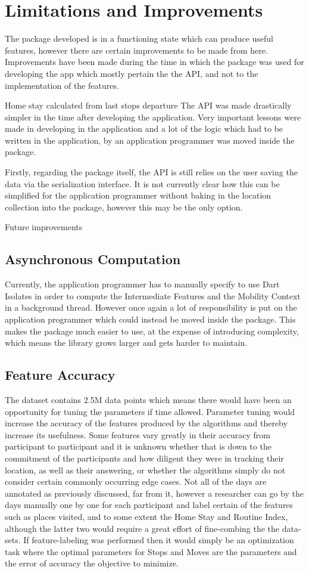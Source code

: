 \section{Limitations and Improvements}
The package developed is in a functioning state which can produce useful features, however there are certain improvements to be made from here. Improvements have been made during the time in which the package was used for developing the app which mostly pertain the the API, and not to the implementation of the features. 

Home stay calculated from last stops departure
The API was made drastically simpler in the time after developing the application. Very important lessons were made in developing in the application and a lot of the logic which had to be written in the application, by an application programmer was moved inside the package.

Firstly, regarding the package itself, the API is still relies on the user saving the data via the serialization interface. It is not currently clear how this can be simplified for the application programmer without baking in the location collection into the package, however this may be the only option. 

Future improvements

\subsection{Asynchronous Computation}
Currently, the application programmer has to manually specify to use Dart Isolates in order to compute the Intermediate Features and the Mobility Context in a background thread. However once again a lot of responsibility is put on the application programmer which could instead be moved inside the package. This makes the package much easier to use, at the expense of introducing complexity, which means the library grows larger and gets harder to maintain.

\subsection{Feature Accuracy}
The dataset contains 2.5M data points which means there would have been an opportunity for tuning the parameters if time allowed. Parameter tuning would increase the accuracy of the features produced by the algorithms and thereby increase its usefulness. Some features vary greatly in their accuracy from participant to participant and it is unknown whether that is down to the commitment of the participants and how diligent they were in tracking their location, as well as their answering, or whether the algorithms simply do not consider certain commonly occurring edge cases. Not all of the days are annotated as previously discussed, far from it, however a researcher can go by the days manually one by one for each participant and label certain of the features such as places visited, and to some extent the Home Stay and Routine Index, although the latter two would require a great effort of fine-combing the the data-sets. If feature-labeling was performed then it would simply be an optimization task where the optimal parameters for Stops and Moves are the parameters and the error of accuracy the objective to minimize. 
